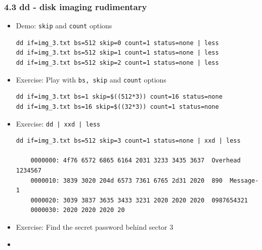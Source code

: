 \begin{frame}[fragile]
  \frametitle{4.3 dd - disk imaging rudimentary}
    \begin{itemize}
        \item[] Demo: \texttt{skip} and \texttt{count} options
\begin{lstlisting}[basicstyle=\tiny]
dd if=img_3.txt bs=512 skip=0 count=1 status=none | less
dd if=img_3.txt bs=512 skip=1 count=1 status=none | less
dd if=img_3.txt bs=512 skip=2 count=1 status=none | less
\end{lstlisting}
        \item[] Exercise: Play with \texttt{bs, skip} and \texttt{count} options
\begin{lstlisting}[basicstyle=\tiny]
dd if=img_3.txt bs=1 skip=$((512*3)) count=16 status=none
dd if=img_3.txt bs=16 skip=$((32*3)) count=1 status=none
\end{lstlisting}
        \item[] Exercise: \texttt{dd | xxd | less}
\begin{lstlisting}[basicstyle=\tiny]
dd if=img_3.txt bs=512 skip=3 count=1 status=none | xxd | less

    0000000: 4f76 6572 6865 6164 2031 3233 3435 3637  Overhead 1234567
    0000010: 3839 3020 204d 6573 7361 6765 2d31 2020  890  Message-1  
    0000020: 3039 3837 3635 3433 3231 2020 2020 2020  0987654321      
    0000030: 2020 2020 2020 20
\end{lstlisting}
        \item[] Exercise: Find the secret password behind sector 3
        \item[] 
    \end{itemize}
\end{frame}


